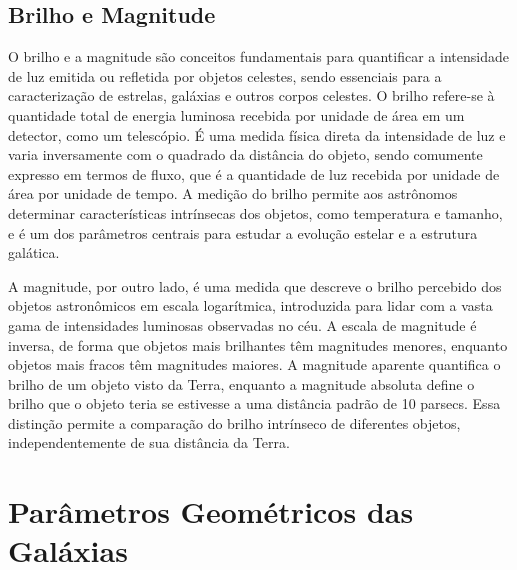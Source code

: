 



\subsection{Brilho e Magnitude}
\label{sec:magnitude}

O brilho e a magnitude são conceitos fundamentais para quantificar a intensidade de luz emitida ou refletida por objetos celestes, sendo essenciais para a caracterização de estrelas, galáxias e outros corpos celestes. O brilho refere-se à quantidade total de energia luminosa recebida por unidade de área em um detector, como um telescópio. É uma medida física direta da intensidade de luz e varia inversamente com o quadrado da distância do objeto, sendo comumente expresso em termos de fluxo, que é a quantidade de luz recebida por unidade de área por unidade de tempo. A medição do brilho permite aos astrônomos determinar características intrínsecas dos objetos, como temperatura e tamanho, e é um dos parâmetros centrais para estudar a evolução estelar e a estrutura galática.

A magnitude, por outro lado, é uma medida que descreve o brilho percebido dos objetos astronômicos em escala logarítmica, introduzida para lidar com a vasta gama de intensidades luminosas observadas no céu. A escala de magnitude é inversa, de forma que objetos mais brilhantes têm magnitudes menores, enquanto objetos mais fracos têm magnitudes maiores. A magnitude aparente quantifica o brilho de um objeto visto da Terra, enquanto a magnitude absoluta define o brilho que o objeto teria se estivesse a uma distância padrão de 10 parsecs. Essa distinção permite a comparação do brilho intrínseco de diferentes objetos, independentemente de sua distância da Terra.






\section{Parâmetros Geométricos das Galáxias}
\label{sec:parametros-geometricos}


